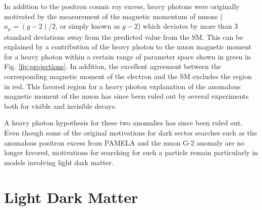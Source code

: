 In addition to the positron cosmic ray excess, heavy photons were originally motivated by the measurement of the magnetic momentum of muons ($a_{\mu}=(g-2)/2$, or simply known as $g-2$) which deviates by more than 3 standard deviations away from the predicted value from the SM. This can be explained by a contribution of the heavy photon to the muon magnetic moment for a heavy photon within a certain range of parameter space shown in green in Fig. \ref{fig:projections}. In addition, the excellent agreement between the corresponding magnetic moment of the electron and the SM excludes the region in red. This favored region for a heavy photon explanation of the anomalous magnetic moment of the muon has since been ruled out by several experiments both for visible and invisible decays.

A heavy photon hypothesis for these two anomalies has since been ruled out. Even though some of the original motivations for dark sector searches such as the anomalous positron excess from PAMELA and the muon G-2 anomaly are no longer favored, motivations for searching for such a particle remain particularly in models involving light dark matter.









\clearpage

\section{Light Dark Matter}\label{sec:ldm}

